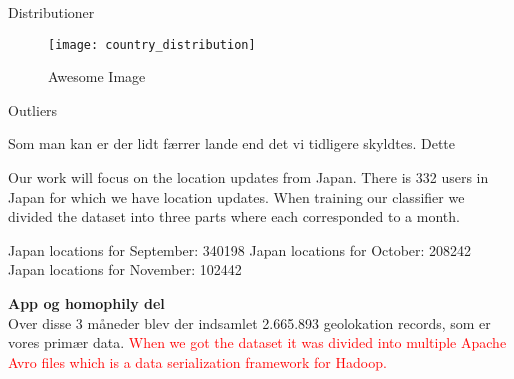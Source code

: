 Distributioner

\begin{figure}[H]
    \centering
    \texttt{[image: country\_distribution]}
    \caption{Awesome Image}
    \label{fig:awesome_image}
\end{figure}
Outliers



Som man kan er der lidt færrer lande end det vi tidligere skyldtes. Dette 

Our work will focus on the location updates from Japan. There is 332 users in Japan for which we have location updates.
When training our classifier we divided the dataset into three parts where each corresponded to a month.

Japan locations for September: 340198
Japan locations for October: 208242
Japan locations for November: 102442

\textbf{App og homophily del}\\


Over disse 3 måneder blev der indsamlet 2.665.893 geolokation records, som er vores primær data. 
\textcolor{red}{When we got the dataset it was divided into multiple Apache Avro files which is a data serialization framework for Hadoop.\cite{apacheavro}}

